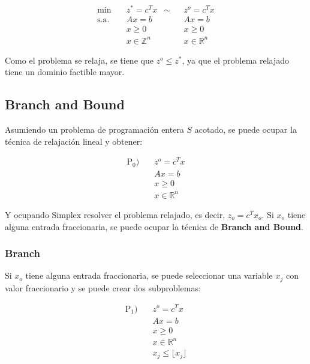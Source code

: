\documentclass{article}
\begin{document}
\begin{align*}
    \min \quad        & z^* = c^T x        & \sim &  & z^o = c^T x        \\
    \text{s.a.} \quad & Ax = b             &      &  & Ax = b             \\
                      & x \geq 0           &      &  & x \geq 0           \\
                      & x \in \mathbb{Z}^n &      &  & x \in \mathbb{R}^n
\end{align*}

Como el problema se relaja, se tiene que $z^o \leq z^*$, ya que el problema relajado tiene un dominio factible mayor.

\subsection{Branch and Bound}

Asumiendo un problema de programación entera $S$ acotado, se puede ocupar la técnica de relajación lineal y obtener:

\begin{align*}
    \text{P}_0) \quad & z^o = c^T x        \\
                      & Ax = b             \\
                      & x \geq 0           \\
                      & x \in \mathbb{R}^n
\end{align*}

Y ocupando Simplex resolver el problema relajado, es decir, $z_o = c^T x_o$. Si $x_o$ tiene alguna entrada fraccionaria, se puede ocupar la técnica de \textbf{Branch and Bound}.

\subsubsection{Branch}

Si $x_o$ tiene alguna entrada fraccionaria, se puede seleccionar una variable $x_j$ con valor fraccionario y se puede crear dos subproblemas:

\begin{align*}
    \text{P}_1) \quad & z^o = c^T x                  \\
                      & Ax = b                       \\
                      & x \geq 0                     \\
                      & x \in \mathbb{R}^n           \\
                      & x_j \leq \lfloor x_j \rfloor
\end{align*}
\end{document}
